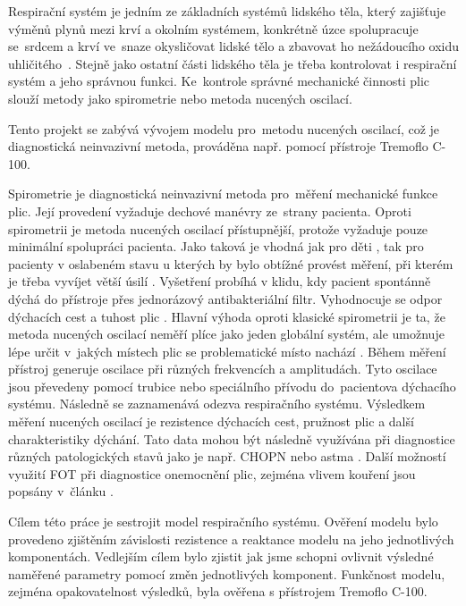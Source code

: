 Respirační systém je jedním ze základních systémů lidského těla, který zajišťuje výměnů plynů mezi krví a okolním systémem, konkrétně úzce spolupracuje se~srdcem a krví ve~snaze okysličovat lidské tělo a zbavovat ho nežádoucího oxidu uhličitého~\cite{muni}. Stejně jako ostatní části lidského těla je třeba kontrolovat i respirační systém a jeho správnou funkci. Ke~kontrole správné mechanické činnosti plic slouží metody jako spirometrie nebo metoda nucených oscilací. 

Tento projekt se zabývá vývojem modelu pro~metodu nucených oscilací, což je diagnostická neinvazivní metoda, prováděna např. pomocí přístroje Tremoflo C-100.  


Spirometrie je diagnostická neinvazivní metoda pro~měření mechanické funkce plic. Její provedení vyžaduje dechové manévry ze~strany pacienta. Oproti spirometrii je metoda nucených oscilací přístupnější, protože vyžaduje pouze minimální spolupráci pacienta. Jako taková je vhodná jak pro děti \cite{StarczewskaDymek2019}, tak pro pacienty v oslabeném stavu u kterých by bylo obtížné provést měření, při kterém je třeba vyvíjet větší úsilí \cite{Vlcek2018}. Vyšetření probíhá v klidu, kdy pacient spontánně dýchá do přístroje přes jednorázový antibakteriální filtr. Vyhodnocuje se odpor dýchacích cest a tuhost plic \cite{Vlcek2018}.
Hlavní výhoda oproti klasické spirometrii je ta, že metoda nucených oscilací neměří plíce jako jeden globální systém, ale umožnuje lépe určit v~jakých místech plic se problematické místo nachází \cite{Bhattarai27August2020}.
Během měření přístroj generuje oscilace při různých frekvencích a amplitudách. Tyto oscilace jsou převedeny pomocí trubice nebo speciálního přívodu do~pacientova dýchacího systému. Následně se zaznamenává odezva respiračního systému. Výsledkem měření nucených oscilací je rezistence dýchacích cest, pružnost plic a další charakteristiky dýchání. Tato data mohou být následně využívána při diagnostice různých patologických stavů jako je např. CHOPN nebo astma \cite{Vlcek2018}.
Další možností využití FOT při diagnostice onemocnění plic, zejména vlivem kouření jsou popsány v~článku \cite{OliveiraRibeiro2018}.


Cílem této práce je sestrojit model respiračního systému. Ověření modelu bylo provedeno zjištěním závislosti rezistence a reaktance modelu na jeho jednotlivých komponentách.
Vedlejším cílem bylo zjistit jak jsme schopni ovlivnit výsledné naměřené parametry pomocí změn jednotlivých komponent. Funkčnost modelu, zejména opakovatelnost výsledků, byla ověřena s přístrojem Tremoflo C-100.

